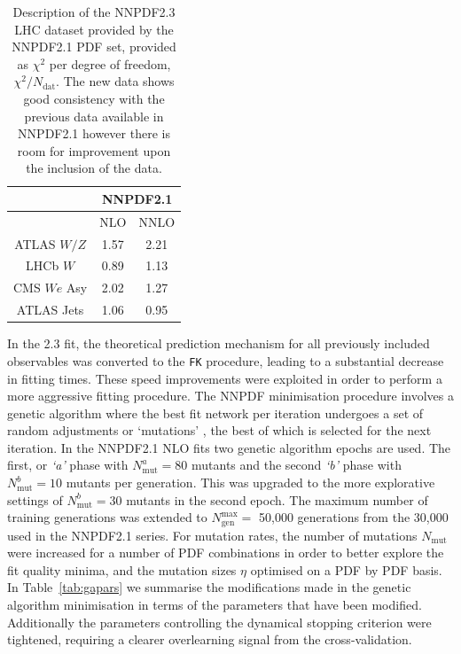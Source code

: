 \begin{table}[htdp]
\begin{center}
\begin{tabular}{c|c|c}

\hline
  & \multicolumn{2}{c}{NNPDF2.1}\\ \hline
    & NLO& NNLO\\
 \hline \hline 
 ATLAS $W/Z$ & 1.57 & 2.21 \\
 \hline
 LHCb $W$ &0.89 &1.13 \\
 \hline
 CMS $We$ Asy & 2.02 & 1.27 \\
 \hline\hline
 ATLAS Jets & 1.06& 0.95\\
 \hline
\end{tabular}
\caption[Description of the NNPDF2.3 LHC dataset by the NNPDF2.1 PDF set]{Description of the NNPDF2.3 LHC dataset provided by the NNPDF2.1 PDF set, provided as $\chi^2$ per degree of freedom, $\chi^2/N_{\text{dat}}$. The new data shows good consistency with the previous data available in NNPDF2.1 however there is room for improvement upon the inclusion of the data.}
\label{tab:23datagreement}
\end{center}
\end{table}

In the 2.3 fit, the theoretical prediction mechanism for all previously included observables was converted to the {\tt FK} procedure, leading to a substantial decrease in fitting times. These speed improvements were exploited in order to perform a more aggressive fitting procedure. The NNPDF minimisation procedure involves a genetic algorithm where the best fit network per iteration undergoes a set of random adjustments or `mutations' , the best of which is selected for the next iteration. In the NNPDF2.1 NLO fits two genetic algorithm epochs are used. The first, or \emph{`a'} phase with $N_{\text{mut}}^a=80$ mutants and the second \emph{`b'} phase with $N_{\text{mut}}^b=10$ mutants per generation. This was upgraded to the more explorative settings of $N_{\text{mut}}^b=30$ mutants in the second epoch. The maximum number of training generations was extended to $N_{\text{gen}}^{\text{max}}=$ 50,000 generations from the 30,000 used in the NNPDF2.1 series.  For mutation rates, the number of mutations $N_{\text{mut}}$ were increased for a number of PDF combinations in order to better explore the fit quality minima, and the mutation sizes $\eta$ optimised on a PDF by PDF basis. In Table~\ref{tab:gapars} we summarise the modifications made in the genetic algorithm minimisation in terms of the parameters that have been modified. Additionally the parameters controlling the dynamical stopping criterion were tightened, requiring a clearer overlearning signal from the cross-validation.

